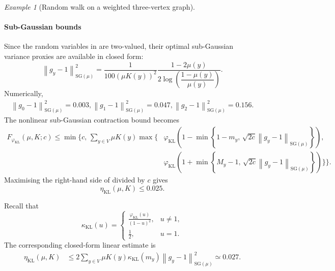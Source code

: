\documentclass[11pt]{article}
\theoremstyle{plain}
\theoremstyle{remark}
\newtheorem{example}{Example}
\begin{document}
\begin{example}[Random walk on a weighted three-vertex graph]
\paragraph*{Sub-Gaussian bounds}
Since the random variables in
 are two-valued, their optimal
sub-Gaussian variance proxies are available in closed form:
\begin{equation}
\left\lVert g_y-1\right\rVert_{\mathrm{SG}(\mu)}^2
=
\frac{1}{100\left(\mu K(y)\right)^2}
\frac{
1-2\mu(y)
}{
2\log\left(
\dfrac{1-\mu(y)}{\mu(y)}
\right)
}.
\label{eq:biasedRefreshmentSubGaussianProxy}
\end{equation}
Numerically,
\begin{align}
\left\lVert g_0-1\right\rVert_{\mathrm{SG}(\mu)}^2
=
0.003,
\left\lVert g_1-1\right\rVert_{\mathrm{SG}(\mu)}^2
=
0.047,
\left\lVert g_2-1\right\rVert_{\mathrm{SG}(\mu)}^2
=
0.156.
\label{eq:biasedRefreshmentSubGaussianValues}
\end{align}
The nonlinear sub-Gaussian contraction bound becomes
\begin{align}
F_{\varphi_{\mathrm{KL}}}(\mu,K;c)
\leq
\min\Bigg\{
c,\,
\sum_{y\in V}
\mu K(y)
\max\Bigg\{
&
\varphi_{\mathrm{KL}}\left(
1-
\min\left\{
1-m_y,\,
\sqrt{2c}
\left\lVert g_y-1\right\rVert_{\mathrm{SG}(\mu)}
\right\}
\right),
\nonumber\\
&
\varphi_{\mathrm{KL}}\left(
1+
\min\left\{
M_y-1,\,
\sqrt{2c}
\left\lVert g_y-1\right\rVert_{\mathrm{SG}(\mu)}
\right\}
\right)
\Bigg\}
\Bigg\}.
\label{eq:biasedRefreshmentNonlinearSubGaussian}
\end{align}
Maximising the right-hand side of
 divided by $c$ gives
\begin{equation}
\eta_{\mathrm{KL}}(\mu,K)
\leq
0.025.
\label{eq:biasedRefreshmentNonlinearSubGaussianSDPI}
\end{equation}

Recall that
\begin{equation}
\kappa_{\mathrm{KL}}(u)
=
\begin{cases}
\displaystyle
\frac{\varphi_{\mathrm{KL}}(u)}{(1-u)^2},
&u\neq1,
\\[2mm]
\displaystyle\frac12,
&u=1.
\end{cases}
\end{equation}
The corresponding closed-form linear estimate is
\begin{align}
\eta_{\mathrm{KL}}(\mu,K)
&\leq
2
\sum_{y\in V}
\mu K(y)
\kappa_{\mathrm{KL}}(m_y)
\left\lVert g_y-1\right\rVert_{\mathrm{SG}(\mu)}^2 \simeq
0.027.
\label{eq:biasedRefreshmentRefinedSubGaussian}
\end{align}


\end{example}
\end{document}

